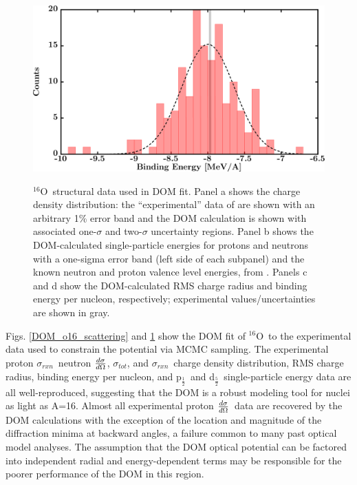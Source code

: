\documentclass[twocolumn,secnumarabic,amssymb, nobibnotes, aps, prl,
superscriptaddress, nobalancelastpage]{revtex4}
\newcommand{\tot}{\ensuremath{\sigma_{tot}}}
\newcommand{\rxn}{\ensuremath{\sigma_{rxn}}}
\newcommand{\el}{\ensuremath{\frac{\lowercase{d}\sigma}{\lowercase{d}\Omega}}}
\newcommand{\oSix}{\ensuremath{^{16}}O}
\newcommand{\pOne}{p\ensuremath{_{\frac{1}{2}}}}
\newcommand{\dFive}{d\ensuremath{_{\frac{5}{2}}}}
\begin{document}
\begin{figure}
\begin{minipage}{0.45\textwidth}
        \label{DOM_o16_RMSRadius}
    \end{minipage}
    \begin{minipage}{0.45\textwidth}
        \centering
        \includegraphics[width=\textwidth]{figures/o16_BE.png}
        \label{DOM_o16_BE}
    \end{minipage}
    \caption{\oSix\ structural data used in DOM fit. Panel a shows the charge
        density distribution: the ``experimental'' data of \cite{DeVries1987}
        are shown with an arbitrary 1\% error band and the DOM calculation is
        shown with associated one-$\sigma$ and two-$\sigma$ uncertainty regions.
        Panel b shows the DOM-calculated single-particle energies for protons
        and neutrons with a one-sigma error band (left side of each subpanel) and
        the known neutron and proton valence level energies, from \cite{AME2016}.
        Panels c and d show the DOM-calculated RMS charge radius and binding energy per
    nucleon, respectively; experimental values/uncertainties are shown in gray.}
    \label{DOM_o16_structural}
\end{figure}

Figs. \ref{DOM_o16_scattering} and \ref{DOM_o16_structural} show the
DOM fit of \oSix\ to the experimental data used to constrain the potential via
MCMC sampling.  The experimental proton \rxn\, neutron \el, \tot, 
and \rxn\, charge density distribution, RMS charge radius, binding energy per nucleon,
and \pOne\ and \dFive\ single-particle energy data are all well-reproduced,
suggesting that the DOM is a robust modeling tool for nuclei as light as A=16.
Almost all experimental proton \el\ data are recovered by the DOM
calculations with the exception of the location and magnitude of the diffraction
minima at backward angles, a failure common to many past optical model analyses.
The assumption that the DOM optical potential can be factored into
independent radial and energy-dependent terms may be responsible for the poorer
performance of the DOM in this region.
\end{document}
